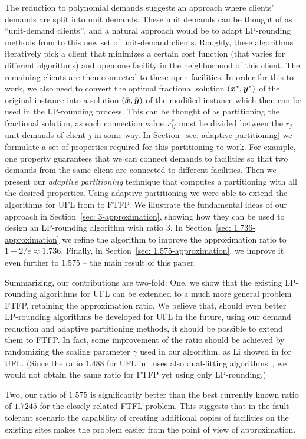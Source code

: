 The reduction to polynomial demands suggests an approach where
clients' demands are split into unit demands. These unit demands can
be thought of as ``unit-demand clients'', and a natural approach would
be to adapt LP-rounding methods from
\cite{gupta08,ChudakS04,ByrkaGS10} to this new set of unit-demand
clients.  Roughly, these algorithms iteratively pick a client that
minimizes a certain cost function (that varies for different
algorithms) and open one facility in the neighborhood of this
client. The remaining clients are then connected to these open
facilities.  In order for this to work, we also need to convert the
optimal fractional solution $(\boldsymbol{x}^\ast,\boldsymbol{y}^\ast)$ of the original
instance into a solution $(\bar{\boldsymbol{x}},\bar{\boldsymbol{y}})$ of the modified instance
which then can be used in the LP-rounding process. This can be thought
of as partitioning the fractional solution, as each connection value
$x^\ast_{ij}$ must be divided between the $r_j$ unit demands
of client $j$ in some way. In Section~\ref{sec: adaptive partitioning} we
formulate a set of properties required for this partitioning to
work. For example, one property guarantees that we can connect demands
to facilities so that two demands from the same client are connected
to different facilities. Then we present our \emph{adaptive
  partitioning} technique that computes a partitioning with all the
desired properties. Using adaptive partitioning we were able to extend
the algorithms for UFL from \cite{gupta08,ChudakS04,ByrkaGS10} to
FTFP. We illustrate the fundamental ideas of our approach in
Section~\ref{sec: 3-approximation}, showing how they can be used to
design an LP-rounding algorithm with ratio $3$.  In Section~\ref{sec:
  1.736-approximation} we refine the algorithm to improve the
approximation ratio to $1+2/e\approx 1.736$.  Finally, in
Section~\ref{sec: 1.575-approximation}, we improve it even further to
$1.575$ -- the main result of this paper.

Summarizing, our contributions are two-fold: One, we show
that the existing LP-rounding algorithms for UFL can be
extended to a much more general problem FTFP, retaining the
approximation ratio. We believe that, should even better
LP-rounding algorithms be developed for UFL in the future,
using our demand reduction and adaptive partitioning
methods, it should be possible to extend them to FTFP.
In fact, some improvement of the ratio
should be achieved by randomizing the scaling parameter
$\gamma$ used in our algorithm, as Li showed in \cite{Li11}
for UFL.  (Since the ratio $1.488$ for UFL in~\cite{Li11}
uses also dual-fitting
algorithms~\cite{MahdianYZ06}, we would not obtain the same
ratio for FTFP yet using only LP-rounding.)

Two, our ratio of $1.575$ is significantly better than the
best currently known ratio of $1.7245$ for the
closely-related FTFL problem. This suggests that in the
fault-tolerant scenario the capability of creating
additional copies of facilities on the existing sites makes
the problem easier from the point of view of approximation.
